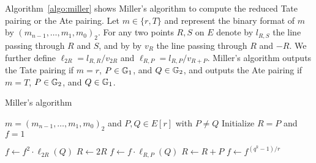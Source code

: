 
Algorithm~\ref{algo:miller} shows Miller's algorithm to compute the reduced Tate pairing or the Ate pairing. 
Let $m \in \{r,T\}$ and represent the binary format of $m$ by $(m_{n-1},\dots,m_1,m_0)_2$.
For any two points $R,S$ on $E$ denote by $l_{R,S}$ the line passing through
$R$ and $S$, and by by $v_R$ the line passing through $R$ and $-R$.
We further define $\ell_{2R} = l_{R,R}/v_{2R}$ and
$\ell_{R,P} = l_{R,P} / v_{R+P}$.
Miller's algorithm outputs the Tate pairing if $m = r$, $P \in \mathbb{G}_{1}$, and $Q \in \mathbb{G}_{2}$, and outputs the Ate pairing if $m = T$, $P \in \mathbb{G}_{2}$, and $Q \in \mathbb{G}_{1}$.

\begin{algorithm}
\caption{Miller's algorithm}
\label{algo:miller}
\begin{algorithmic}[1]

	\Require $m = (m_{n-1}, \dots, m_1, m_0)_2$ and $P,Q \in E[r]$ with $P \ne Q$
	\State Initialize $R = P$ and $f = 1$

		\State $f \leftarrow f^2 \cdot \ell_{2R}(Q)$
		\State $R \leftarrow 2R$
			\State $f \leftarrow f \cdot \ell_{R,P}(Q)$
			\State $R \leftarrow R+P$
		\EndIf
	\EndFor
	\State $f \leftarrow f^{(q^k-1)/r}$

\end{algorithmic}
\end{algorithm}

